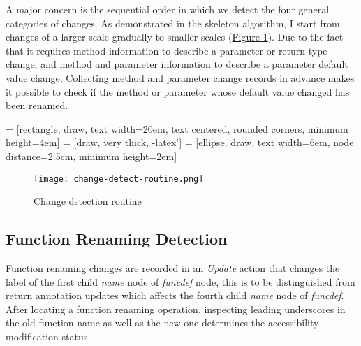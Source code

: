 A major concern is the sequential order in which we detect the four general categories of changes. As demonstrated in the skeleton algorithm, I start from changes of a larger scale gradually to smaller scales (\hyperref[fig:change-detect-routine]{Figure \ref*{fig:change-detect-routine}}). Due to the fact that it requires method information to describe a parameter or return type change, and method and parameter information to describe a parameter default value change, Collecting method and parameter change records in advance makes it possible to check if the method or parameter whose default value changed has been renamed.

 = [rectangle, draw, text width=20em, text centered, rounded corners, minimum height=4em]
 = [draw, very thick, -latex']
 = [ellipse, draw, text width=6em, node distance=2.5cm, minimum height=2em]

\begin{figure}
	\caption{Change detection routine}
	\label{fig:change-detect-routine}
	\texttt{[image: change-detect-routine.png]}
\end{figure}

\begin{figure}[!t]
	
	\vspace{-5mm}
\end{figure}

\subsection{Function Renaming Detection}
\label{subsec:func-rename-detect}

Function renaming changes are recorded in an \textit{Update} action that changes the label of the first child \textit{name} node of \textit{funcdef} node, this is to be distinguished from return annotation updates which affects the fourth child \textit{name} node of \textit{funcdef}. After locating a function renaming operation, inspecting leading underscores in the old function name as well as the new one determines the accessibility modification status.

